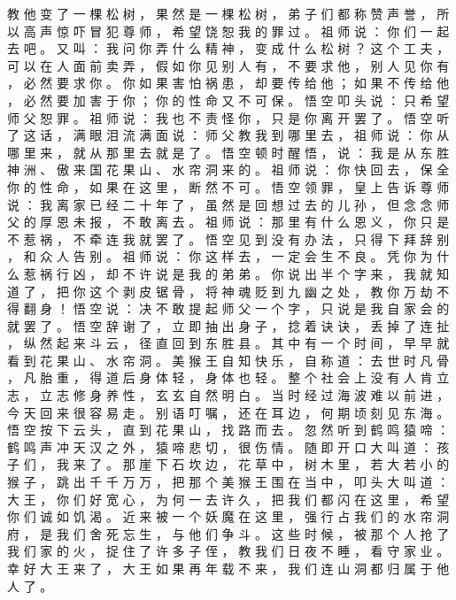 {教 他 变 了 一 棵 松 树 ， 果 然 是 一 棵 松 树 ， 弟 子 们 都 称 赞 声 誉 ， 所 以 高 声 惊 吓 冒 犯 尊 师 ， 希 望 饶 恕 我 的 罪 过 。
祖 师 说 ： 你 们 一 起 去 吧 。
又 叫 ： 我 问 你 弄 什 么 精 神 ， 变 成 什 么 松 树 ？ 这 个 工 夫 ， 可 以 在 人 面 前 卖 弄 ， 假 如 你 见 别 人 有 ， 不 要 求 他 ， 别 人 见 你 有 ， 必 然 要 求 你 。
你 如 果 害 怕 祸 患 ， 却 要 传 给 他 ； 如 果 不 传 给 他 ， 必 然 要 加 害 于 你 ； 你 的 性 命 又 不 可 保 。
悟 空 叩 头 说 ： 只 希 望 师 父 恕 罪 。
祖 师 说 ： 我 也 不 责 怪 你 ， 只 是 你 离 开 罢 了 。
悟 空 听 了 这 话 ， 满 眼 泪 流 满 面 说 ： 师 父 教 我 到 哪 里 去 ， 祖 师 说 ： 你 从 哪 里 来 ， 就 从 那 里 去 就 是 了 。
悟 空 顿 时 醒 悟 ， 说 ： 我 是 从 东 胜 神 洲 、 傲 来 国 花 果 山 、 水 帘 洞 来 的 。
祖 师 说 ： 你 快 回 去 ， 保 全 你 的 性 命 ， 如 果 在 这 里 ， 断 然 不 可 。
悟 空 领 罪 ， 皇 上 告 诉 尊 师 说 ： 我 离 家 已 经 二 十 年 了 ， 虽 然 是 回 想 过 去 的 儿 孙 ， 但 念 念 师 父 的 厚 恩 未 报 ， 不 敢 离 去 。
祖 师 说 ： 那 里 有 什 么 恩 义 ， 你 只 是 不 惹 祸 ， 不 牵 连 我 就 罢 了 。
悟 空 见 到 没 有 办 法 ， 只 得 下 拜 辞 别 ， 和 众 人 告 别 。
祖 师 说 ： 你 这 样 去 ， 一 定 会 生 不 良 。
凭 你 为 什 么 惹 祸 行 凶 ， 却 不 许 说 是 我 的 弟 弟 。
你 说 出 半 个 字 来 ， 我 就 知 道 了 ， 把 你 这 个 剥 皮 锯 骨 ， 将 神 魂 贬 到 九 幽 之 处 ， 教 你 万 劫 不 得 翻 身 ！ 悟 空 说 ： 决 不 敢 提 起 师 父 一 个 字 ， 只 说 是 我 自 家 会 的 就 罢 了 。
悟 空 辞 谢 了 ， 立 即 抽 出 身 子 ， 捻 着 诀 诀 ， 丢 掉 了 连 扯 ， 纵 然 起 来 斗 云 ， 径 直 回 到 东 胜 县 。
其 中 有 一 个 时 间 ， 早 早 就 看 到 花 果 山 、 水 帘 洞 。
美 猴 王 自 知 快 乐 ， 自 称 道 ： 去 世 时 凡 骨 ， 凡 胎 重 ， 得 道 后 身 体 轻 ， 身 体 也 轻 。
整 个 社 会 上 没 有 人 肯 立 志 ， 立 志 修 身 养 性 ， 玄 玄 自 然 明 白 。
当 时 经 过 海 波 难 以 前 进 ， 今 天 回 来 很 容 易 走 。
别 语 叮 嘱 ， 还 在 耳 边 ， 何 期 顷 刻 见 东 海 。
悟 空 按 下 云 头 ， 直 到 花 果 山 ， 找 路 而 去 。
忽 然 听 到 鹤 鸣 猿 啼 ： 鹤 鸣 声 冲 天 汉 之 外 ， 猿 啼 悲 切 ， 很 伤 情 。
随 即 开 口 大 叫 道 ： 孩 子 们 ， 我 来 了 。 那 崖 下 石 坎 边 ， 花 草 中 ， 树 木 里 ， 若 大 若 小 的 猴 子 ， 跳 出 千 千 万 万 ， 把 那 个 美 猴 王 围 在 当 中 ， 叩 头 大 叫 道 ： 大 王 ， 你 们 好 宽 心 ， 为 何 一 去 许 久 ， 把 我 们 都 闪 在 这 里 ， 希 望 你 们 诚 如 饥 渴 。
近 来 被 一 个 妖 魔 在 这 里 ， 强 行 占 我 们 的 水 帘 洞 府 ， 是 我 们 舍 死 忘 生 ， 与 他 们 争 斗 。
这 些 时 候 ， 被 那 个 人 抢 了 我 们 家 的 火 ， 捉 住 了 许 多 子 侄 ， 教 我 们 日 夜 不 睡 ， 看 守 家 业 。
幸 好 大 王 来 了 ， 大 王 如 果 再 年 载 不 来 ， 我 们 连 山 洞 都 归 属 于 他 人 了 。
}
